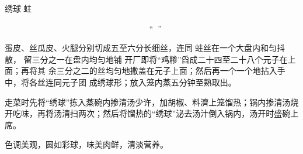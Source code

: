 \begin{recipe}{绣球𧎼蛀}

\ingredients


\preparation

\step 𧎼蛀抠去玉带，淘洗干净，掺清水上笼蒸𤆵，取出挤干水晾冷，搓散成丝；鸡脯、
肥膘分别砸茸；鸡蛋清调匀，加清水、豆粉、味精、盐搅成“鸡糁”；用鸡蛋一个摊成蛋皮
。

\step 蛋皮、丝瓜皮、火腿分别切成五至六分长细丝，连同𧎼蛀丝在一个大盘内和匀抖散，
留三分之一在盘内均匀地铺 开厂即将“鸡糁”舀成二十四至二十八个元子在上面；再将其
余三分之二的丝均匀地撒盖在元子上面；然后再一个一个地拈入手中，将各丝连同元子团
成绣球形；放入笼内蒸五分钟至熟取出。

\step 走菜时先将“绣球”拣入蒸碗内掺清汤少许，加胡椒、料濟上笼馏热；锅内掺清汤烧
开吃味，再将汤清扫两次；然后将馏热的“绣球”泌去汤汁倒入锅内，汤开时盛碗上席。

\features

色调美观，圆如彩球，味美肉鲜，清淡营养。

\end{recipe}

